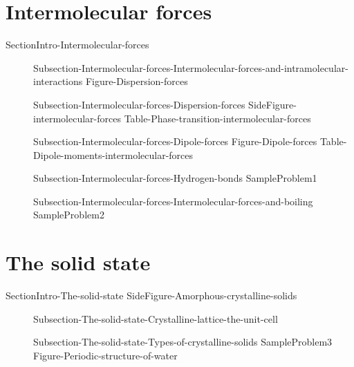 \documentclass[main.tex]{subfiles}
\begin{document}
\section{Intermolecular forces}{SectionIntro-Intermolecular-forces}
\sloppy \begin{description}
\item[] {Subsection-Intermolecular-forces-Intermolecular-forces-and-intramolecular-interactions}
{Figure-Dispersion-forces}
\item[] {Subsection-Intermolecular-forces-Dispersion-forces}
{SideFigure-intermolecular-forces}
{Table-Phase-transition-intermolecular-forces}
\item[] {Subsection-Intermolecular-forces-Dipole-forces}
{Figure-Dipole-forces}
{Table-Dipole-moments-intermolecular-forces}
\item[] {Subsection-Intermolecular-forces-Hydrogen-bonds}
{SampleProblem1}
\item[] {Subsection-Intermolecular-forces-Intermolecular-forces-and-boiling}
{SampleProblem2}
\end{description}

\section{The solid state}{SectionIntro-The-solid-state}
{SideFigure-Amorphous-crystalline-solids}
\vspace{2cm}{Figure-Chrystalline-solid-unit-cell}
\sloppy \begin{description}
\item[] {Subsection-The-solid-state-Crystalline-lattice-the-unit-cell}
\item[] {Subsection-The-solid-state-Types-of-crystalline-solids}
{SampleProblem3}
{Figure-Periodic-structure-of-water}
\end{description}
\end{document}

